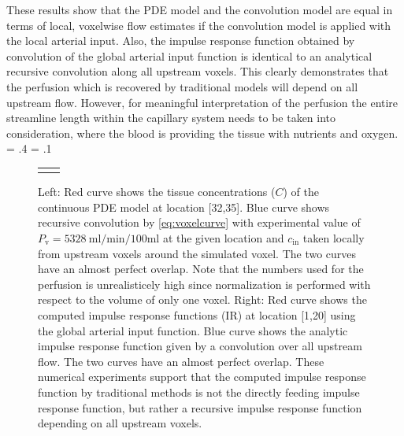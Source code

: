 \documentclass[journal,twocolumn]{IEEEtran}
\newcommand{\Perfv}{P_{\mathrm{v}}}
\newcommand{\siPml}{\milli\litre\per\minute\per100\milli\litre}
\newlength{\fwd}
\newlength{\fht}
\begin{document}
These results show that the PDE model and the convolution model are equal in terms of local, voxelwise flow estimates if the convolution model is applied with the local arterial input. 
Also, the impulse response function obtained by convolution of the global arterial input function is identical to an analytical recursive convolution along all upstream voxels. 
This clearly demonstrates that the perfusion which is recovered by traditional models will depend on all upstream flow.
However, for meaningful interpretation of the perfusion the entire streamline length within the capillary system needs to be taken into consideration, where the blood is providing the tissue with nutrients and oxygen. 
	\fwd = .4\textwidth
	\fht = .1\textheight	
	\begin{figure}
		{
		\small
		\begin{tabular}{c c}
			 & \\
		\end{tabular}
		}
		\caption{Left: Red curve shows the tissue concentrations ($C$) of the continuous PDE model at location [32,35]. Blue curve shows recursive convolution by \eqref{eq:voxelcurve} with experimental value of $\Perfv=\SI{5328}{\siPml}$ at the given location and $c_{\mathrm{in}}$ taken locally from upstream voxels around the simulated voxel. The two curves have an almost perfect overlap. Note that the numbers used for the perfusion is unrealisticely high since normalization is performed with respect to the volume of only one voxel. Right: Red curve shows the computed impulse response functions (IR) at location [1,20] using the global arterial input function. Blue curve shows the analytic impulse response function given by a convolution over all upstream flow. The two curves have an almost perfect overlap. These numerical experiments support that the computed impulse response function by traditional methods is not the directly feeding impulse response function, but rather a recursive impulse response function depending on all upstream voxels.}\label{fig:VoxelComp}
	\end{figure}


\end{document}
